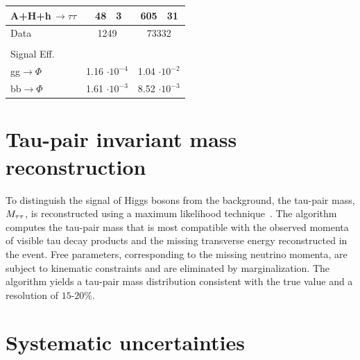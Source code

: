 \begin{table}[!h]
\begin{center}
\begin{tabular}{|l|r@{$ \,\,\pm\,\, $}l|r@{$ \,\,\pm\,\, $}l|}
\hline 
A+H+h\,$\rightarrow\tau\tau$       &       48      &       3     &       605     &       31       \\ 
\hline 
Data                             & \multicolumn{2}{|c|}{1249}    & \multicolumn{2}{|c|}{73332}   \\ 
\hline 
\multicolumn{5}{c}{ } \\
\multicolumn{2}{l}{Signal Eff.} &  \multicolumn{3}{c}{ } \\
\hline
gg$\rightarrow\Phi$                &       \multicolumn{2}{|c|}{1.16 $\cdot 10^{-4}$}      &       \multicolumn{2}{|c|}{1.04 $\cdot 10^{-2}$}\\ 
\hline 
bb$\rightarrow\Phi$                &       \multicolumn{2}{|c|}{1.61 $\cdot 10^{-3}$}      &       \multicolumn{2}{|c|}{8.52 $\cdot 10^{-3}$}\\ 
\hline 
\end{tabular} 
\label{table:events_etau} 
\end{center} 
\end{table} 

\section{Tau-pair invariant mass reconstruction}

To distinguish the signal of Higgs bosons from the background, 
the tau-pair mass, $M_{\mathrm{\tau}\mathrm{\tau}}$, is reconstructed using a maximum likelihood technique~\cite{CMS-PAPER-HIG-10-002}. The algorithm computes the tau-pair mass that is most compatible with the observed momenta of visible tau decay products and the missing transverse energy reconstructed in the event. Free parameters, corresponding to the missing neutrino momenta, are subject to kinematic constraints and are eliminated by marginalization. The algorithm yields a tau-pair mass distribution consistent with the true value and a resolution of $15$-$20\%$.

\section{Systematic uncertainties}

